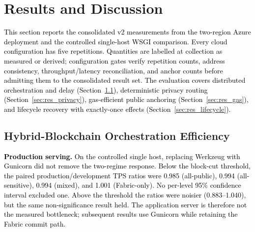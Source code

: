 \documentclass[final,5p,times,twocolumn]{elsarticle}
\begin{document}
%

\section{\textbf{Results and Discussion}}
\label{sec:results}

\textcolor{black}{This section reports the consolidated v2 measurements from the two-region Azure deployment and the controlled single-host WSGI comparison. Every cloud configuration has five repetitions. Quantities are labelled at collection as measured or derived; configuration gates verify repetition counts, address consistency, throughput/latency reconciliation, and anchor counts before admitting them to the consolidated result set. The evaluation covers distributed orchestration and delay (Section~\ref{sec:res_orch}), deterministic privacy routing (Section~\ref{sec:res_privacy}), gas-efficient public anchoring (Section~\ref{sec:res_gas}), and lifecycle recovery with exactly-once effects (Section~\ref{sec:res_lifecycle}).}

\subsection{\textbf{Hybrid-Blockchain Orchestration Efficiency}}
\label{sec:res_orch}

\textcolor{black}{\textbf{Production serving.} On the controlled single host, replacing Werkzeug with Gunicorn did not remove the two-regime response. Below the block-cut threshold, the paired production/development TPS ratios were 0.985 (all-public), 0.994 (all-sensitive), 0.994 (mixed), and 1.001 (Fabric-only). No per-level 95\% confidence interval excluded one. Above the threshold the ratios were noisier (0.883--1.040), but the same non-significance result held. The application server is therefore not the measured bottleneck; subsequent results use Gunicorn while retaining the Fabric commit path.}
\end{document}
